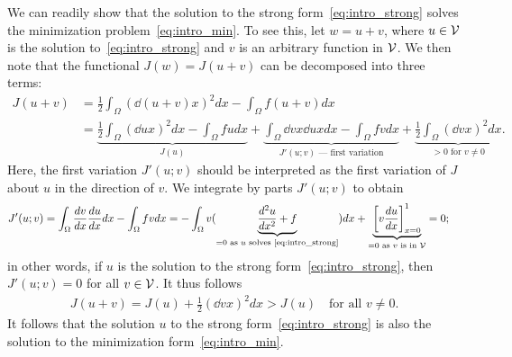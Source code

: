 We can readily show that the solution to the strong form~\eqref{eq:intro_strong} solves the minimization problem~\eqref{eq:intro_min}.  To see this, let $w = u + v$, where $u \in \mathcal{V}$ is the solution to~\eqref{eq:intro_strong} and $v$ is an arbitrary function in $\mathcal{V}$.  We then note that the functional $J(w) = J(u+v)$ can be decomposed into three terms:
\begin{align*}
  J(u+v) &= \frac{1}{2} \int_{\Omega} \left( \dd{(u+v)}{x} \right)^2 dx - \int_\Omega f(u+v) dx \\
  &= \underbrace{ \frac{1}{2} \int_{\Omega} \left( \dd{u}{x} \right)^2 dx - \int_\Omega f u dx }_{J(u)}
  + \underbrace{ \int_{\Omega} \dd{v}{x} \dd{u}{x} dx - \int_\Omega f v dx }_{J'(u;v) \text{ --- first variation}}
  + \underbrace{ \frac{1}{2} \int_{\Omega} \left( \dd{v}{x} \right)^2 dx }_{> 0 \text{ for } v \neq 0}.
\end{align*}
Here, the first variation $J'(u;v)$ should be interpreted as the first variation of $J$ about $u$ in the direction of $v$.  We integrate by parts $J'(u;v)$ to obtain
\begin{align*}
  J'(u;v) &= \int_{\Omega} \frac{d v}{d x} \frac{d u}{d x} dx - \int_\Omega f v dx
  =
  - \int_{\Omega} v ( \underbrace{ \frac{d ^2u}{d x^2} + f}_{= 0 \text{ as $u$ solves \eqref{eq:intro_strong}}} ) dx + \underbrace{ \left[ v \frac{d u}{d x} \right]_{x=0}^1 }_{= 0 \text{ as $v$ is in $\mathcal{V}$}}
  = 0;
\end{align*}
in other words, if $u$ is the solution to the strong form~\eqref{eq:intro_strong}, then $J'(u;v) = 0$ for all $v \in \mathcal{V}$. It thus follows
\begin{align*}
  J(u + v) = J(u) + \frac{1}{2} \left( \dd{v}{x} \right)^2 dx
  > J(u)  \quad \text{for all $v \neq 0$}.
\end{align*}
It follows that the solution $u$ to the strong form~\eqref{eq:intro_strong} is also the solution to the minimization form~\eqref{eq:intro_min}.

